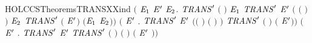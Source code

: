 \begin{SaveVerbatim}{HOLCCSTheoremsTRANSXXind}
     \ensuremath{(}\HOLSymConst{\HOLTokenForall{}}  \ensuremath{\HOLBoundVar{E}\sb{\mathrm{1}}} \ensuremath{\HOLBoundVar{E}\sp{\prime{}}} \ensuremath{\HOLBoundVar{E}\sb{\mathrm{2}}}.
        \ensuremath{\HOLBoundVar{TRANS}\sp{\prime{}}}  \ensuremath{(} \ensuremath{)} \ensuremath{\HOLBoundVar{E}\sb{\mathrm{1}}} \HOLSymConst{\HOLTokenConj{}} \ensuremath{\HOLBoundVar{TRANS}\sp{\prime{}}} \ensuremath{\HOLBoundVar{E}\sp{\prime{}}} \ensuremath{(} \ensuremath{(} \ensuremath{)}\ensuremath{)} \ensuremath{\HOLBoundVar{E}\sb{\mathrm{2}}} \HOLSymConst{\HOLTokenImp{}}
        \ensuremath{\HOLBoundVar{TRANS}\sp{\prime{}}} \ensuremath{(} \HOLSymConst{\ensuremath{\mid}} \ensuremath{\HOLBoundVar{E}\sp{\prime{}}}\ensuremath{)} \HOLConst{\ensuremath{\tau}} \ensuremath{(}\ensuremath{\HOLBoundVar{E}\sb{\mathrm{1}}} \HOLSymConst{\ensuremath{\mid}} \ensuremath{\HOLBoundVar{E}\sb{\mathrm{2}}}\ensuremath{)}\ensuremath{)} \HOLSymConst{\HOLTokenConj{}}
     \ensuremath{(}\HOLSymConst{\HOLTokenForall{}}  \ensuremath{\HOLBoundVar{E}\sp{\prime{}}}  .
        \ensuremath{\HOLBoundVar{TRANS}\sp{\prime{}}}   \ensuremath{\HOLBoundVar{E}\sp{\prime{}}} \HOLSymConst{\HOLTokenConj{}}
        \ensuremath{(}\ensuremath{(} \HOLSymConst{\ensuremath{=}} \HOLConst{\ensuremath{\tau}}\ensuremath{)} \HOLSymConst{\HOLTokenDisj{}} \ensuremath{(} \HOLSymConst{\ensuremath{=}}  \ensuremath{)} \HOLSymConst{\HOLTokenConj{}}  \HOLConst{\HOLTokenNotIn{}}  \HOLSymConst{\HOLTokenConj{}}   \HOLConst{\HOLTokenNotIn{}} \ensuremath{)} \HOLSymConst{\HOLTokenImp{}}
        \ensuremath{\HOLBoundVar{TRANS}\sp{\prime{}}} \ensuremath{(}  \ensuremath{)}  \ensuremath{(}  \ensuremath{\HOLBoundVar{E}\sp{\prime{}}}\ensuremath{)}\ensuremath{)} \HOLSymConst{\HOLTokenConj{}}
     \ensuremath{(}\HOLSymConst{\HOLTokenForall{}}  \ensuremath{\HOLBoundVar{E}\sp{\prime{}}} .
        \ensuremath{\HOLBoundVar{TRANS}\sp{\prime{}}}   \ensuremath{\HOLBoundVar{E}\sp{\prime{}}} \HOLSymConst{\HOLTokenImp{}}
        \ensuremath{\HOLBoundVar{TRANS}\sp{\prime{}}} \ensuremath{(}  \ensuremath{)} \ensuremath{(}  \ensuremath{)} \ensuremath{(} \ensuremath{\HOLBoundVar{E}\sp{\prime{}}} \ensuremath{)}\ensuremath{)} \HOLSymConst{\HOLTokenConj{}}

\end{SaveVerbatim}
